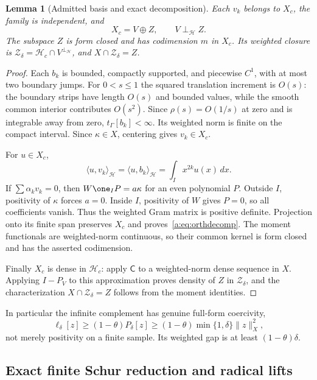 \documentclass[11pt,a4paper]{article}
\numberwithin{equation}{section}
\newtheorem{lemma}[theorem]{Lemma}
\theoremstyle{definition}\newtheorem{definition}[theorem]{Definition}
\theoremstyle{remark}\newtheorem{remark}[theorem]{Remark}
\newcommand{\Hh}{\mathcal H}\newcommand{\Hw}{\mathcal H}
\newcommand{\tg}{t_\Gamma}\newcommand{\cg}{c_\Gamma}
\newcommand{\ip}[2]{\langle#1,#2\rangle}\newcommand{\norm}[1]{\lVert#1\rVert}\newcommand{\abs}[1]{\lvert#1\rvert}
\newcommand{\Zc}{\mathcal Z_\delta}\newcommand{\Rcal}{\mathcal R}
\begin{document}
\begin{lemma}[Admitted basis and exact decomposition]\label{a:lem:VZ}
Each $v_k$ belongs to $X_c$, the family is independent, and
\begin{equation}\label{a:eq:orthdecomp}
 X_c=V\oplus Z,\qquad V\perp_{\Hh} Z.
\end{equation}
The subspace $Z$ is form closed and has codimension $m$ in $X_c$. Its weighted closure is
$\Zc=\Hh_c\cap V^{\perp_{\Hh}}$, and $X\cap\Zc=Z$.
\end{lemma}
\begin{proof}
Each $b_k$ is bounded, compactly supported, and piecewise $C^1$, with at most two boundary jumps. For $0<s\le1$ the squared translation increment is $O(s)$: the boundary strips have length $O(s)$ and bounded values, while the smooth common interior contributes $O(s^2)$. Since $\rho(s)=O(1/s)$ at zero and is integrable away from zero, $\tg[b_k]<\infty$. Its weighted norm is finite on the compact interval. Since $\kappa\in X$, centering gives $v_k\in X_c$.

For $u\in X_c$,
\[
 \ip u{v_k}_{\Hh}=\ip u{b_k}_{\Hh}
                    =\int_Ix^{2k}u(x)\,dx.
\]
If $\sum\alpha_kv_k=0$, then $W\one_IP=a\kappa$ for an even polynomial $P$. Outside $I$, positivity of $\kappa$ forces $a=0$. Inside $I$, positivity of $W$ gives $P=0$, so all coefficients vanish. Thus the weighted Gram matrix is positive definite. Projection onto its finite span preserves $X_c$ and proves~\eqref{a:eq:orthdecomp}. The moment functionals are weighted-norm continuous, so their common kernel is form closed and has the asserted codimension.

Finally $X_c$ is dense in $\Hh_c$: apply $\mathsf C$ to a weighted-norm dense sequence in $X$. Applying $I-P_V$ to this approximation proves density of $Z$ in $\Zc$, and the characterization $X\cap\Zc=Z$ follows from the moment identities.
\end{proof}

In particular the infinite complement has genuine full-form coercivity,
\begin{equation}\label{a:eq:Zcoercive}
 \ell_\delta[z]\ge(1-\theta)P_\delta[z]
 \ge(1-\theta)\min\{1,\delta\}\norm z_X^2,
\end{equation}
not merely positivity on a finite sample. Its weighted gap is at least $(1-\theta)\delta$.

\subsection{Exact finite Schur reduction and radical lifts}\label{a:sec:schur}
\end{document}
